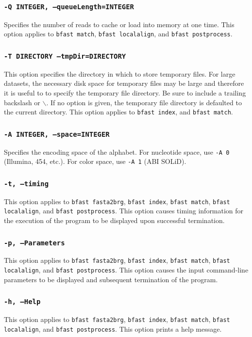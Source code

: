 \documentclass[a4paper,12pt]{book}
\newcommand{\TT}[1]{{\tt #1}} %
\begin{document}
\subsubsection{\TT{-Q INTEGER, --queueLength=INTEGER}}
Specifies the number of reads to cache or load into memory at one time.
This option applies to \TT{bfast match}, \TT{bfast localalign}, and \TT{bfast postprocess}.

\subsubsection{\TT{-T DIRECTORY --tmpDir=DIRECTORY}}
This option specifies the directory in which to store temporary files.
For large datasets, the necessary disk space for temporary files may be large and therefore it is useful to to specify the temporary file directory. 
Be sure to include a trailing backslash or $\backslash$.
If no option is given, the temporary file directory is defaulted to the current directory.
This option applies to \TT{bfast index}, and \TT{bfast match}.

\subsubsection{\TT{-A INTEGER, --space=INTEGER}}
Specifies the encoding space of the alphabet.
For nucleotide space, use \TT{-A 0} (Illumina, 454, etc.).
For color space, use \TT{-A 1} (ABI SOLiD).

\subsubsection{\TT{-t, --timing}}
This option applies to \TT{bfast fasta2brg}, \TT{bfast index}, \TT{bfast match}, \TT{bfast localalign}, and \TT{bfast postprocess}.
This option causes timing information for the execution of the program to be displayed upon successful termination.

\subsubsection{\TT{-p, --Parameters}}
This option applies to \TT{bfast fasta2brg}, \TT{bfast index}, \TT{bfast match}, \TT{bfast localalign}, and \TT{bfast postprocess}.
This option causes the input command-line parameters to be displayed and subsequent termination of the program.

\subsubsection{\TT{-h, --Help}}
This option applies to \TT{bfast fasta2brg}, \TT{bfast index}, \TT{bfast match}, \TT{bfast localalign}, and \TT{bfast postprocess}.
This option prints a help message.
\end{document}
